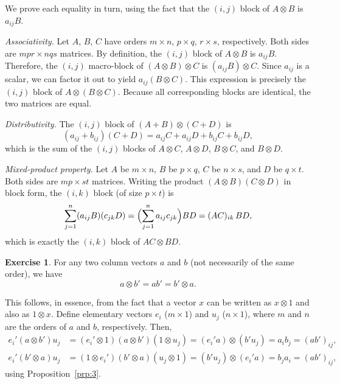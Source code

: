 \documentclass[12pt,a4paper]{article}
\makeatletter
\theoremstyle{definition}
\newtheorem{exercise}{Exercise}
\renewenvironment{proof}[1][\proofname]{\par
  \pushQED{\qed}%
  \normalfont \topsep6\p@\@plus6\p@\relax
  \trivlist
  \item[\hskip\labelsep\bfseries #1\@addpunct{.}]\ignorespaces
}{%
  \popQED\endtrivlist\@endpefalse
}
\newenvironment{solution}{%
  \begin{proof}[Solution]%
}{%
  \end{proof}%
}
\makeatother
\begin{document}
\begin{proof}
We prove each equality in turn, using the fact that the $(i,j)$ block of $A \otimes B$ is $a_{ij}B$. %

\emph{Associativity.} Let $A$, $B$, $C$ have orders $m \times n$, $p \times q$, $r \times s$, respectively. Both sides are $mpr \times nqs$ matrices. By definition, the $(i,j)$ block of $A \otimes B$ is $a_{ij}B$. Therefore, the $(i,j)$ macro-block of $(A \otimes B) \otimes C$ is $(a_{ij}B) \otimes C$. Since $a_{ij}$ is a scalar, we can factor it out to yield $a_{ij}(B \otimes C)$. This expression is precisely the $(i,j)$ block of $A \otimes (B \otimes C)$. Because all corresponding blocks are identical, the two matrices are equal.

\emph{Distributivity.} The $(i,j)$ block of $(A + B) \otimes (C + D)$ is
\[
(a_{ij} + b_{ij})(C + D) = a_{ij}C + a_{ij}D + b_{ij}C + b_{ij}D,
\]
which is the sum of the $(i,j)$ blocks of $A \otimes C$, $A \otimes D$, $B \otimes C$, and $B \otimes D$. %

\emph{Mixed-product property.} Let $A$ be $m \times n$, $B$ be $p \times q$, $C$ be $n \times s$, and $D$ be $q \times t$. Both sides are $mp \times st$ matrices. Writing the product $(A \otimes B)(C \otimes D)$ in block form, the $(i,k)$ block (of size $p \times t$) is
\[
\sum_{j=1}^{n} (a_{ij}B)(c_{jk}D) = \Bigl(\sum_{j=1}^{n} a_{ij}c_{jk}\Bigr) BD = (AC)_{ik}\, BD,
\]
which is exactly the $(i,k)$ block of $AC \otimes BD$. %
\end{proof}

\begin{exercise}\label{exer:1}
For any two column vectors $a$ and $b$ (not necessarily of the same order), we have
\[
a \otimes b' = ab' = b' \otimes a.
\]
\end{exercise}

\begin{solution}
This follows, in essence, from the fact that a vector $x$ can be written as $x \otimes 1$ and also as $1 \otimes x$. %
Define elementary vectors $e_i$ ($m \times 1$) and $u_j$ ($n \times 1$), where $m$ and $n$ are the orders of $a$ and $b$, respectively. Then,
\begin{align*}
e_i'(a \otimes b')u_j &= (e_i' \otimes 1)(a \otimes b')(1 \otimes u_j)
= (e_i'a) \otimes (b'u_j) = a_i b_j = (ab')_{ij}, \\
e_i'(b' \otimes a)u_j &= (1 \otimes e_i')(b' \otimes a)(u_j \otimes 1)
= (b'u_j) \otimes (e_i'a) = b_j a_i = (ab')_{ij},
\end{align*}
using Proposition~\ref{prp:3}. %
\end{solution}
\end{document}
